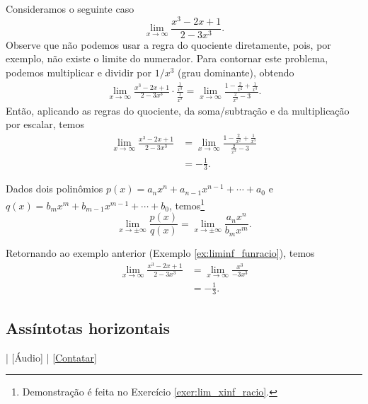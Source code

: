 \begin{ex}\label{ex:liminf_funracio}
  Consideramos o seguinte caso
  \begin{equation}
    \lim_{x\to \infty} \frac{x^3 - 2x + 1}{2 - 3x^3}.
  \end{equation}
  Observe que não podemos usar a regra do quociente diretamente, pois, por exemplo, não existe o limite do numerador. Para contornar este problema, podemos multiplicar e dividir por $1/x^3$ (grau dominante), obtendo
  \begin{align}
    \lim_{x\to\infty} \frac{x^3 - 2x + 1}{2 - 3x^3}\cdot\frac{\frac{1}{x^3}}{\frac{1}{x^3}} = \lim_{x\to\infty} \frac{1-\frac{2}{x^2} + \frac{1}{x^3}}{\frac{2}{x^3}-3}. 
  \end{align}
  Então, aplicando as regras do quociente, da soma/subtração e da multiplicação por escalar, temos
  \begin{align}
    \lim_{x\to\infty} \frac{x^3 - 2x + 1}{2 - 3x^3} &= \lim_{x\to\infty} \frac{1-\frac{2}{x^2} + \frac{1}{x^3}}{\frac{2}{x^3}-3}\\
                                                    &= -\frac{1}{3}.
  \end{align}
\end{ex}

\begin{obs}\label{obs:lim_xinf_racio}
  Dados dois polinômios $p(x) = a_nx^n+a_{n-1}x^{n-1}+\cdots + a_0$ e $q(x) = b_mx^m+b_{m-1}x^{m-1}+\cdots + b_0$, temos\footnote{Demonstração é feita no Exercício \ref{exer:lim_xinf_racio}.}
  \begin{equation}
    \lim_{x\to \pm\infty} \frac{p(x)}{q(x)} = \lim_{x\to\pm\infty}\frac{a_nx^n}{b_mx^m}.
  \end{equation}
\end{obs}

\begin{ex}
  Retornando ao exemplo anterior (Exemplo \ref{ex:liminf_funracio}), temos
  \begin{align}
    \lim_{x\to\infty} \frac{x^3 - 2x + 1}{2 - 3x^3} &= \lim_{x\to\infty} \frac{x^3}{-3x^3} \\
    &= -\frac{1}{3}.
  \end{align}
\end{ex}

\subsection{Assíntotas horizontais}

\begin{flushright}
  [Vídeo] | [Áudio] | \href{https://phkonzen.github.io/notas/contato.html}{[Contatar]}
\end{flushright}

